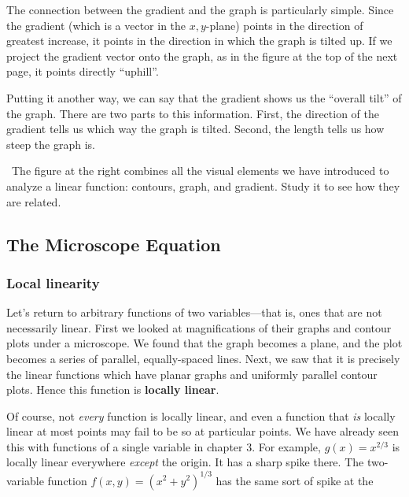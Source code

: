 {{{{	The connection between the 
gradient and the graph is particularly simple. Since the gradient (which is a vector in the $x, y$-plane) points in the direction of greatest increase, it points in the direction in which the graph is tilted up.  If we project the gradient vector onto the graph, as in the figure at the top of the next page, it points directly ``uphill''.
\linebreak	
	
\newpage
\noindent
Putting it another way, we can say that the gradient shows us the ``overall tilt'' of the graph.  There are two parts to this information.  First, the direction of the gradient tells us which way the graph is tilted.  Second, the length tells us how steep the graph is.

\quad \ The figure at the right combines all the visual elements we have introduced to analyze a linear function: contours, graph, and gradient.  Study it to see how they are related.


\subsection{The Microscope Equation}

\subsubsection{Local linearity}

	Let's return to arbitrary functions of two variables---that is, ones that are not necessarily linear. 
First we looked at magnifications of their graphs and contour plots under a microscope.  We found that the graph becomes a plane, and the plot becomes a series of parallel, equally-spaced lines.  Next, we saw that it is precisely the linear functions which have planar graphs and uniformly parallel contour plots. Hence this function is {\bf locally linear}.   

	Of course, not {\em every\/} function is locally linear, 
and even a function that {\em is\/} locally linear at most points may fail to be so at particular points.  We have already seen this with functions of a single variable in chapter 3.  For example, $g(x) = x^{2/3}$ is locally linear everywhere {\em except\/} the origin.  It has a sharp spike there.  The two-variable function $f(x, y) = (x^2 + y^2)^{1/3}$ has the same sort of spike at the 
\linebreak 
\vspace{-10pt}

}}}}
